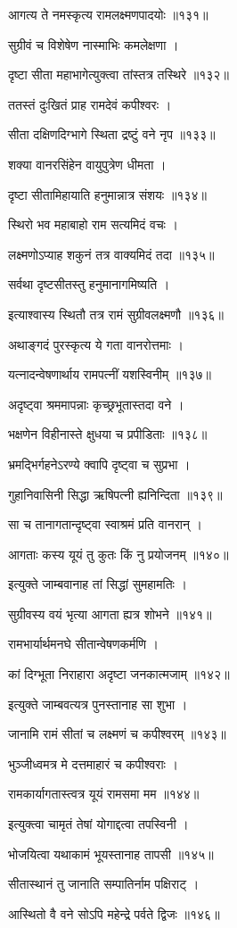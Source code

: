 आगत्य ते नमस्कृत्य रामलक्ष्मणपादयोः ॥१३१॥

सुग्रीवं च विशेषेण नास्माभिः कमलेक्षणा ।

दृष्टा सीता महाभागेत्युक्त्वा तांस्तत्र तस्थिरे ॥१३२॥

ततस्तं दुःखितं प्राह रामदेवं कपीश्वरः ।

सीता दक्षिणदिग्भागे स्थिता द्रष्टुं वने नृप ॥१३३॥

शक्या वानरसिंहेन वायुपुत्रेण धीमता ।

दृष्टा सीतामिहायाति हनुमान्नात्र संशयः ॥१३४॥

स्थिरो भव महाबाहो राम सत्यमिदं वचः ।

लक्ष्मणोऽप्याह शकुनं तत्र वाक्यमिदं तदा ॥१३५॥

सर्वथा दृष्टसीतस्तु हनुमानागमिष्यति ।

इत्याश्वास्य स्थितौ तत्र रामं सुग्रीवलक्ष्मणौ ॥१३६॥

अथाङ्गदं पुरस्कृत्य ये गता वानरोत्तमाः ।

यत्नादन्वेषणार्थाय रामपत्नीं यशस्विनीम् ॥१३७॥

अदृष्ट्वा श्रममापन्नाः कृच्छ्रभूतास्तदा वने ।

भक्षणेन विहीनास्ते क्षुधया च प्रपीडिताः ॥१३८॥

भ्रमद्भिर्गहनेऽरण्ये क्वापि दृष्ट्वा च सुप्रभा ।

गुहानिवासिनी सिद्धा ऋषिपत्नी ह्यनिन्दिता ॥१३९॥

सा च तानागतान्दृष्ट्वा स्वाश्रमं प्रति वानरान् ।

आगताः कस्य यूयं तु कुतः किं नु प्रयोजनम् ॥१४०॥

इत्युक्ते जाम्बवानाह तां सिद्धां सुमहामतिः ।

सुग्रीवस्य वयं भृत्या आगता ह्यत्र शोभने ॥१४१॥

रामभार्यार्थमनघे सीतान्वेषणकर्मणि ।

कां दिग्भूता निराहारा अदृष्टा जनकात्मजाम् ॥१४२॥

इत्युक्ते जाम्बवत्यत्र पुनस्तानाह सा शुभा ।

जानामि रामं सीतां च लक्ष्मणं च कपीश्वरम् ॥१४३॥

भुञ्जीध्वमत्र मे दत्तमाहारं च कपीश्वराः ।

रामकार्यागतास्त्वत्र यूयं रामसमा मम ॥१४४॥

इत्युक्त्वा चामृतं तेषां योगाद्दत्वा तपस्विनी ।

भोजयित्वा यथाकामं भूयस्तानाह तापसी ॥१४५॥

सीतास्थानं तु जानाति सम्पातिर्नाम पक्षिराट् ।

आस्थितो वै वने सोऽपि महेन्द्रे पर्वते द्विजः ॥१४६॥

